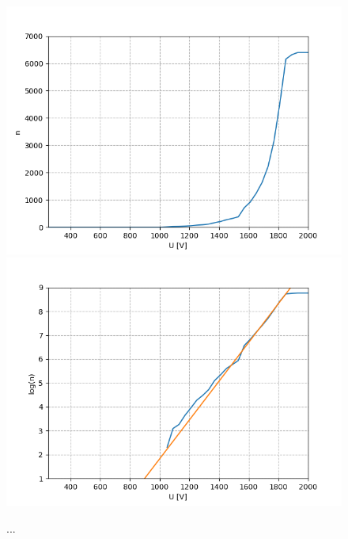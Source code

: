 \documentclass[12pt,a4paper]{article}
\begin{document}
\begin{figure}
\centering
\includegraphics[scale=0.8]{Bilder/Prop/C_Puls_lin.PNG}
\includegraphics[scale=0.8]{Bilder/Prop/C_Puls_exp.PNG}
\caption{...}
\label{fig:CPulse}
\end{figure}
\end{document}
